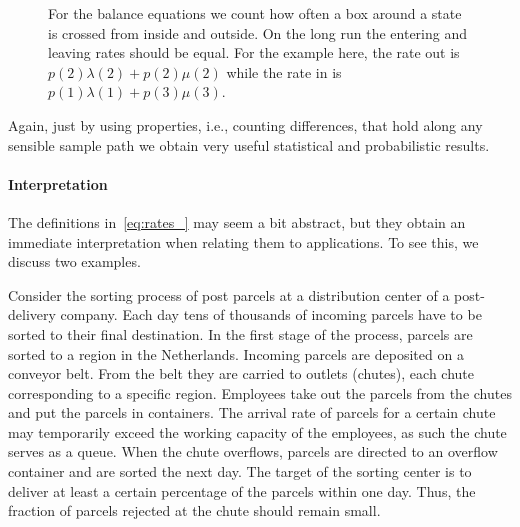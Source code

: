 \begin{figure}[t]
  \centering
{}
\caption{ For the balance equations we count how often a box around a
  state is crossed from inside and outside. On the long run the
  entering and leaving rates should be equal. For the example here,
  the rate out is $p(2)\lambda(2) + p(2) \mu(2)$ while the rate in is
  $p(1)\lambda(1)+p(3)\mu(3)$.}
\label{fig:balance}
\end{figure}


Again, just by using properties, i.e., counting differences, that hold
along any sensible sample path we obtain very useful statistical and
probabilistic results.


\paragraph{Interpretation}

The definitions in~\cref{eq:rates_} may seem a bit abstract, but they obtain an immediate interpretation when relating them to applications.
To see this, we discuss two examples.

Consider the sorting process of post parcels at a distribution center of a post-delivery company.
Each day tens of thousands of incoming parcels have to be sorted to their final destination.
In the first stage of the process, parcels are sorted to a region in the Netherlands.
Incoming parcels are deposited on a conveyor belt.
From the belt they are carried to outlets (chutes), each chute corresponding to a specific region.
Employees take out the parcels from the chutes and put the parcels in containers.
The arrival rate of parcels for a certain chute may temporarily exceed the working capacity of the employees, as such the chute serves as a queue.
When the chute overflows, parcels are directed to an overflow container and are sorted the next day.
The target of the sorting center is to deliver at least a certain percentage of the parcels within one day.
Thus, the fraction of parcels rejected at the chute should remain small.

